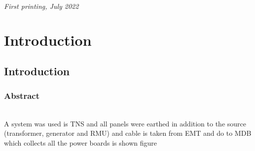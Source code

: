 \documentclass[12pt,fleqn]{book} %
\begin{document}

\noindent \textit{First printing, July 2022} %




\pagestyle{empty} %

\tableofcontents %
\listoffigures
\listoftables


\pagestyle{fancy} %

\part {Introduction }
\chapter{Introduction }

\section{Abstract}
\\ A system was used is TNS and all panels were earthed in addition to the source (transformer, generator and RMU) and cable is taken from EMT and do to MDB which collects all the power boards is shown figure
\end{document}
